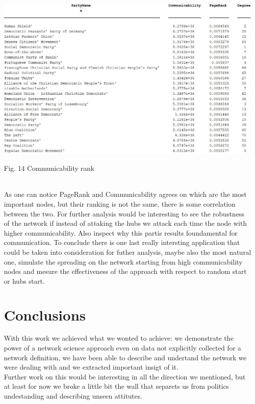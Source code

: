 \documentclass{article}%
\begin{document}
\includegraphics[scale=0.6]{communicability}
\begin{center}
\begin{small}
Fig. 14 Communicability rank 
\end{small}
\end{center}
~
\\
As one can notice PageRank and Communicability agrees on which are the most important nodes, but their ranking is not the same, there is some correlation between the two.
For further analysis would be interesting to see the robustness of the network if instead of attaking the hubs we attack each time the node with higher communicability. Also inspect why this partis results foundamental for communication.
To conclude there is one last really intersting application that could be taken into consideration for futher analysis, maybe also the most natural one, simulate the spreading on the network starting from high communicability nodes and mesure the effectiveness of the approach with respect to random start or hubs start.
\\





\section*{Conclusions}

With this work we achieved what we wonted to achieve: we demonstrate the power of a network science approach even on data not explicitly collected for a network definition, we have been able to describe and undertand the network we were dealing with and we extracted important insigt of it.
\\

Further work on this would be interesting in all the direction we mentioned, but at least for now we broke a little bit the wall that separets us from politics undestanding and describing unseen attitutes.
\end{document}
